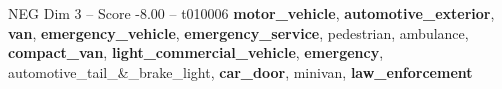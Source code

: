 \begin{textsample}{NEG Dim 3 – Score -8.00 – t010006}  \label{ex:f3_neg_010}
\textbf{motor\_vehicle}, \textbf{automotive\_exterior}, \textbf{van}, \textbf{emergency\_vehicle}, \textbf{emergency\_service}, pedestrian, ambulance, \textbf{compact\_van}, \textbf{light\_commercial\_vehicle}, \textbf{emergency}, automotive\_tail\_\&\_brake\_light, \textbf{car\_door}, minivan, \textbf{law\_enforcement}

\end{textsample}
